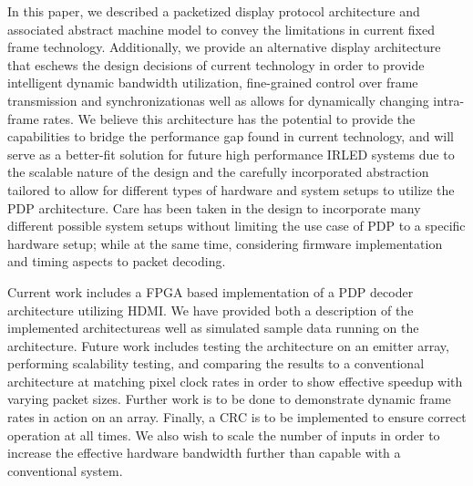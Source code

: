 \label{chap:conclusion}
In this paper, we described a packetized display protocol architecture and associated abstract machine model to convey the limitations in current fixed frame technology. Additionally, we provide an alternative display architecture that eschews the design decisions of current technology in order to provide intelligent dynamic bandwidth utilization, fine-grained control over frame transmission and synchronizationas well as allows for dynamically changing intra-frame rates. We believe this architecture has the potential to provide the capabilities to bridge the performance gap found in current technology, and will serve as a better-fit solution for future high performance IRLED systems due to the scalable nature of the design and the carefully incorporated abstraction tailored to allow for different types of hardware and system setups to utilize the PDP architecture. Care has been taken in the design to incorporate many different possible system setups without limiting the use case of PDP to a specific hardware setup; while at the same time, considering firmware implementation and timing aspects to packet decoding.

Current work includes a FPGA based implementation of a PDP decoder architecture utilizing HDMI. We have provided both a description of the implemented architectureas well as simulated sample data running on the architecture. Future work includes testing the architecture on an emitter array, performing scalability testing, and comparing the results to a conventional architecture at matching pixel clock rates in order to show effective speedup with varying packet sizes. Further work is to be done to demonstrate dynamic frame rates in action on an array. Finally, a CRC is to be implemented to ensure correct operation at all times. We also wish to scale the number of inputs in order to increase the effective hardware bandwidth further than capable with a conventional system.
